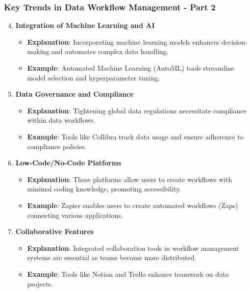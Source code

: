 \documentclass[aspectratio=169]{beamer}
\begin{document}
\begin{frame}[fragile]
    \frametitle{Key Trends in Data Workflow Management - Part 2}
    \begin{enumerate}
        \setcounter{enumi}{3} %
        \item \textbf{Integration of Machine Learning and AI}
        \begin{itemize}
            \item \textbf{Explanation}: Incorporating machine learning models enhances decision-making and automates complex data handling.
            \item \textbf{Example}: Automated Machine Learning (AutoML) tools streamline model selection and hyperparameter tuning.
        \end{itemize}
        
        \item \textbf{Data Governance and Compliance}
        \begin{itemize}
            \item \textbf{Explanation}: Tightening global data regulations necessitate compliance within data workflows. 
            \item \textbf{Example}: Tools like Collibra track data usage and ensure adherence to compliance policies.
        \end{itemize}
        
        \item \textbf{Low-Code/No-Code Platforms}
        \begin{itemize}
            \item \textbf{Explanation}: These platforms allow users to create workflows with minimal coding knowledge, promoting accessibility.
            \item \textbf{Example}: Zapier enables users to create automated workflows (Zaps) connecting various applications.
        \end{itemize}
        
        \item \textbf{Collaborative Features}
        \begin{itemize}
            \item \textbf{Explanation}: Integrated collaboration tools in workflow management systems are essential as teams become more distributed.
            \item \textbf{Example}: Tools like Notion and Trello enhance teamwork on data projects.
        \end{itemize}
    \end{enumerate}
\end{frame}
\end{document}
